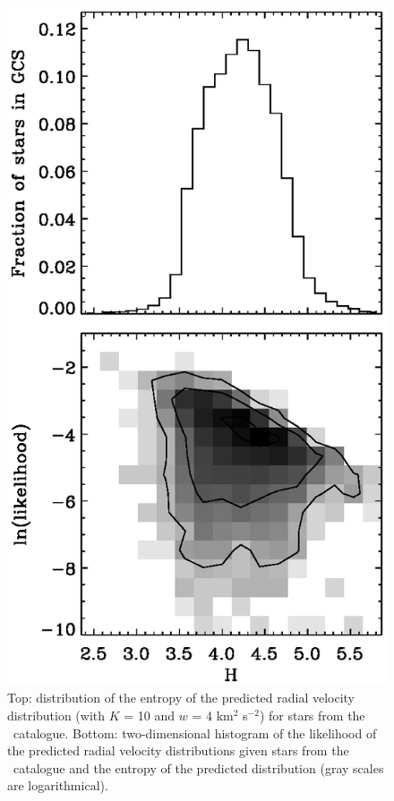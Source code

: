 \clearpage
\begin{figure}
\includegraphics{figs_veldist/hist_gcs_ent.ps}
\caption[Distribution of the entropy of the predicted radial velocity distribution for stars from the \gcsabb\ catalogue]{Top: distribution of the entropy of the predicted radial velocity distribution (with $K$ = 10 and $w$ = 4 km$^2$ s$^{-2}$) for stars from the \gcsabb\ catalogue. Bottom: two-dimensional histogram of the likelihood of the predicted radial velocity distributions given stars from the \gcsabb\ catalogue and the entropy of the predicted distribution (gray scales are logarithmical).}%
\label{fig:hist_gcs_ent}
\end{figure}



